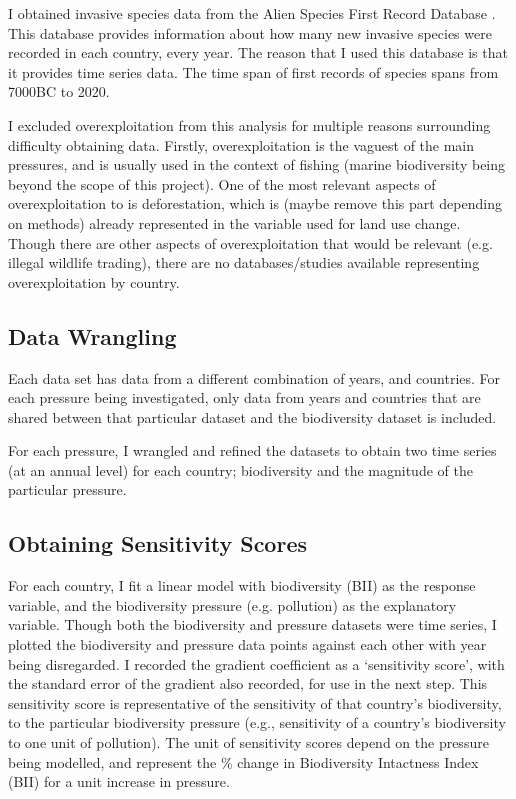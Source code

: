 \documentclass[11pt, a4paper, titlepage]{article}
\begin{document}
	I obtained invasive species data from the Alien Species First Record Database \citep{seebens2017no, seebens2018global}. This database provides information about how many new invasive species were recorded in each country, every year. The reason that I used this database is that it provides time series data. The time span of first records of species spans from 7000BC to 2020.  
	
	I excluded overexploitation from this analysis for multiple reasons surrounding difficulty obtaining data. Firstly, overexploitation is the vaguest of the main pressures, and is usually used in the context of fishing (marine biodiversity being beyond the scope of this project). One of the most relevant aspects of overexploitation to is deforestation, which is (maybe remove this part depending on methods) already represented in the variable used for land use change. Though there are other aspects of overexploitation that would be relevant (e.g. illegal wildlife trading), there are no databases/studies available representing overexploitation by country.

	\subsection*{Data Wrangling}
	
	Each data set has data from a different combination of years, and countries. For each pressure being investigated, only data from years and countries that are shared between that particular dataset and the biodiversity dataset is included. 
	
	For each pressure, I wrangled and refined the datasets to obtain two time series (at an annual level) for each country; biodiversity and the magnitude of the particular pressure.
	
	
	\subsection*{Obtaining Sensitivity Scores}
	
	For each country, I fit a linear model with biodiversity (BII) as the response variable, and the biodiversity pressure (e.g. pollution) as the explanatory variable. Though both the biodiversity and pressure datasets were time series, I plotted the biodiversity and pressure data points against each other with year being disregarded. I recorded the gradient coefficient as a `sensitivity score', with the standard error of the gradient also recorded, for use in the next step. This sensitivity score is representative of the sensitivity of that country's biodiversity, to the particular biodiversity pressure (e.g., sensitivity of a country's biodiversity to one unit of pollution). The unit of sensitivity scores depend on the pressure being modelled, and represent the \% change in Biodiversity Intactness Index (BII) for a unit increase in pressure.  
	
\end{document}
